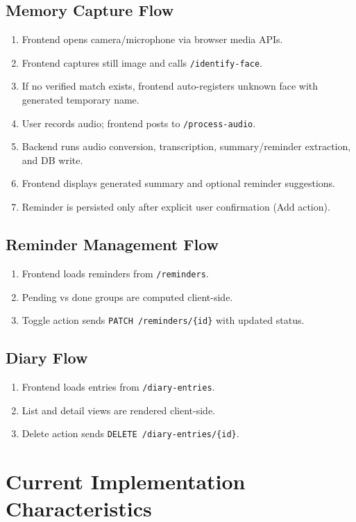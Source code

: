 \documentclass[12pt,a4paper]{article}
\begin{document}
\subsection{Memory Capture Flow}
\begin{enumerate}
  \item Frontend opens camera/microphone via browser media APIs.
  \item Frontend captures still image and calls \texttt{/identify-face}.
  \item If no verified match exists, frontend auto-registers unknown face with generated temporary name.
  \item User records audio; frontend posts to \texttt{/process-audio}.
  \item Backend runs audio conversion, transcription, summary/reminder extraction, and DB write.
  \item Frontend displays generated summary and optional reminder suggestions.
  \item Reminder is persisted only after explicit user confirmation (Add action).
\end{enumerate}

\subsection{Reminder Management Flow}
\begin{enumerate}
  \item Frontend loads reminders from \texttt{/reminders}.
  \item Pending vs done groups are computed client-side.
  \item Toggle action sends \texttt{PATCH /reminders/\{id\}} with updated status.
\end{enumerate}

\subsection{Diary Flow}
\begin{enumerate}
  \item Frontend loads entries from \texttt{/diary-entries}.
  \item List and detail views are rendered client-side.
  \item Delete action sends \texttt{DELETE /diary-entries/\{id\}}.
\end{enumerate}

\section{Current Implementation Characteristics}
\end{document}

